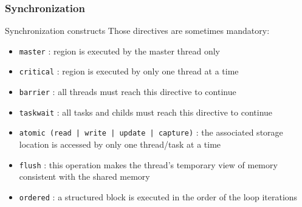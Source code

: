 \begin{frame}
\frametitle{Synchronization}
\begin{block}{Synchronization constructs}
Those directives are sometimes mandatory:
\begin{itemize}
        \item{\texttt{master} : region is executed by the master thread only }
        \item{\texttt{critical} : region is executed by only one thread at a time }
        \item{\texttt{barrier} : all threads must reach this directive to continue}
        \item{\texttt{taskwait} : all tasks and childs must reach this directive to continue}
        \item{\texttt{atomic (read | write | update | capture)} : the associated storage location is accessed by only one thread/task at a time}
        \item{\texttt{flush} : this operation makes the thread's temporary view of memory consistent with the shared memory}
        \item{\texttt{ordered} : a structured block is executed in the order of the loop iterations }
\end{itemize}
\end{block}

\end{frame}


